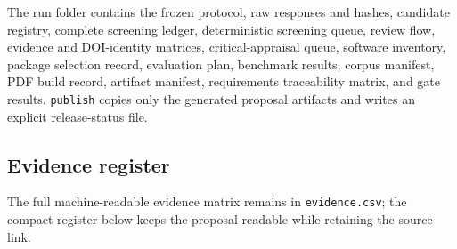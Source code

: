 \documentclass[11pt]{article}
\begin{document}
The run folder contains the frozen protocol, raw responses and hashes, candidate registry, complete screening ledger, deterministic screening queue, review flow, evidence and DOI-identity matrices, critical-appraisal queue, software inventory, package selection record, evaluation plan, benchmark results, corpus manifest, PDF build record, artifact manifest, requirements traceability matrix, and gate results. \texttt{publish} copies only the generated proposal artifacts and writes an explicit release-status file.

\hypertarget{evidence-register}{%
\subsection{Evidence register}\label{evidence-register}}

The full machine-readable evidence matrix remains in \texttt{evidence.csv}; the compact register below keeps the proposal readable while retaining the source link.
\end{document}

